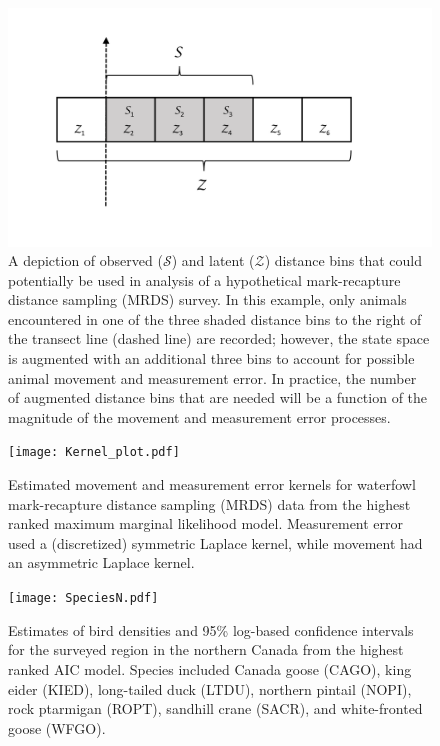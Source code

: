 \documentclass[aoas,preprint]{imsart}
\numberwithin{equation}{section}
\theoremstyle{plain}
\begin{document}
\pagebreak
\begin{figure}
\begin{center}
\includegraphics[width=150mm]{augmented_bin_figure.pdf}
\caption{A depiction of observed ($\mathcal{S}$) and latent ($\mathcal{Z}$) distance bins that could potentially be used in analysis of a hypothetical mark-recapture distance sampling (MRDS) survey.  In this example, only animals encountered in one of the three shaded distance bins to the right of the transect line (dashed line) are recorded; however, the state space is augmented with an additional three bins to account for possible animal movement and measurement error.  In practice, the number of augmented distance bins that are needed will be a function of the magnitude of the movement and measurement error processes.}
\label{fig:aug_bins}
\end{center}
\end{figure}


\pagebreak
\begin{figure}
\begin{center}
\texttt{[image: Kernel\_plot.pdf]}
\caption{Estimated movement and measurement error kernels for waterfowl mark-recapture distance sampling (MRDS) data from the highest ranked maximum marginal likelihood model. Measurement error used a (discretized) symmetric Laplace kernel, while movement had an asymmetric Laplace kernel.}
\label{fig:kernel}
\end{center}
\end{figure}

\pagebreak
\begin{figure}
\begin{center}
\texttt{[image: SpeciesN.pdf]}
\caption{Estimates of bird densities and 95\% log-based confidence intervals for the surveyed region in the northern Canada from the highest ranked AIC model.  Species included Canada goose (CAGO), king eider (KIED), long-tailed duck (LTDU), northern pintail (NOPI), rock ptarmigan (ROPT), sandhill crane (SACR), and white-fronted goose (WFGO).}
\label{fig:speciesD}
\end{center}
\end{figure}
\end{document}
